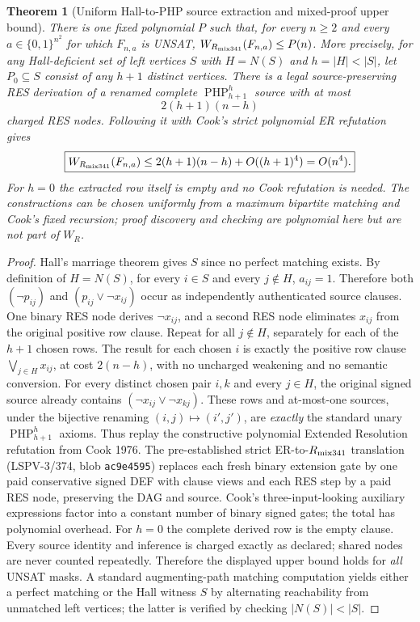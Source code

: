\documentclass[11pt]{article}
\newtheorem{theorem}{Theorem}
\begin{document}
\begin{theorem}[Uniform Hall-to-PHP source extraction and mixed-proof upper bound]
There is one fixed polynomial $P$ such that, for every $n\ge2$ and every $a\in\{0,1\}^{n^2}$ for which $F_{n,a}$ is UNSAT, $W_{R_{\rm mix341}}(F_{n,a})\le P(n)$. More precisely, for any Hall-deficient set of left vertices $S$ with $H=N(S)$ and $h=|H|<|S|$, let $P_0\subseteq S$ consist of any $h+1$ distinct vertices. There is a legal source-preserving RES derivation of a renamed \emph{complete} $\operatorname{PHP}_{h+1}^{h}$ source with at most
\[
\boxed{2(h+1)(n-h)}
\]
charged RES nodes. Following it with Cook's strict polynomial ER refutation gives
\[
\boxed{W_{R_{\rm mix341}}(F_{n,a})
       \le 2(h+1)(n-h)+O((h+1)^4)=O(n^4).}
\]
For $h=0$ the extracted row itself is empty and no Cook refutation is needed. The constructions can be chosen uniformly from a maximum bipartite matching and Cook's fixed recursion; proof \emph{discovery and checking} are polynomial here but are not part of $W_R$.
\end{theorem}
\begin{proof}
Hall's marriage theorem gives $S$ since no perfect matching exists. By definition of $H=N(S)$, for every $i\in S$ and every $j\notin H$, $a_{ij}=1$. Therefore both $(\neg p_{ij})$ and $(p_{ij}\lor\neg x_{ij})$ occur as independently authenticated source clauses. One binary RES node derives $\neg x_{ij}$, and a second RES node eliminates $x_{ij}$ from the original positive row clause. Repeat for all $j\notin H$, separately for each of the $h+1$ chosen rows. The result for each chosen $i$ is exactly the positive row clause $\bigvee_{j\in H}x_{ij}$, at cost $2(n-h)$, with no uncharged weakening and no semantic conversion. For every distinct chosen pair $i,k$ and every $j\in H$, the original signed source already contains $(\neg x_{ij}\lor\neg x_{kj})$. These rows and at-most-one sources, under the bijective renaming $(i,j)\mapsto(i',j')$, are \emph{exactly} the standard unary $\operatorname{PHP}_{h+1}^{h}$ axioms. Thus replay the constructive polynomial Extended Resolution refutation from Cook 1976. The pre-established strict ER-to-$R_{\rm mix341}$ translation (LSPV-3/374, blob \texttt{ac9e4595}) replaces each fresh binary extension gate by one paid conservative signed DEF with clause views and each RES step by a paid RES node, preserving the DAG and source. Cook's three-input-looking auxiliary expressions factor into a constant number of binary signed gates; the total has polynomial overhead. For $h=0$ the complete derived row is the empty clause. Every source identity and inference is charged exactly as declared; shared nodes are never counted repeatedly. Therefore the displayed upper bound holds for \emph{all} UNSAT masks. A standard augmenting-path matching computation yields either a perfect matching or the Hall witness $S$ by alternating reachability from unmatched left vertices; the latter is verified by checking $|N(S)|<|S|$. 
\end{proof}
\end{document}
